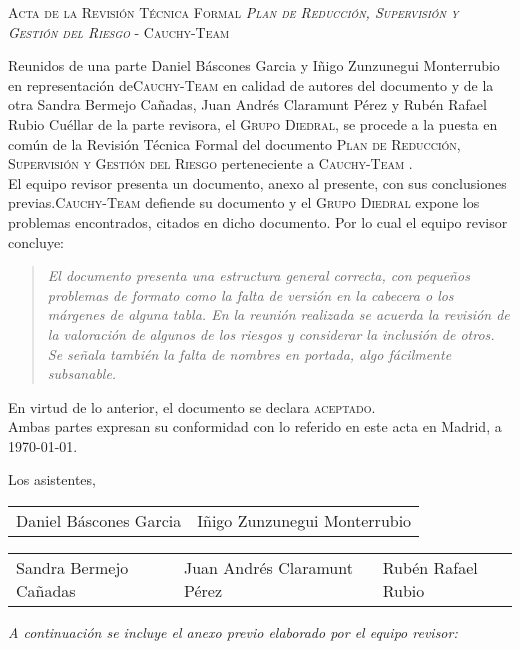 \documentclass[11pt, a4paper, twoside]{article}
\newcommand*{\Cauchy}{\mbox{\textsc{Cauchy-Team}} }
\begin{document}
	\begin{center}
		\scshape \large Acta de la Revisión Técnica Formal \textit{Plan de Reducción, Supervisión y Gestión del Riesgo} - \Cauchy
	\end{center}

	Reunidos de una parte Daniel Báscones Garcia y Iñigo Zunzunegui Monterrubio en representación de\break \Cauchy en calidad de autores del documento y de la otra Sandra Bermejo Cañadas, Juan Andrés Claramunt Pérez y Rubén Rafael Rubio Cuéllar de la parte revisora, el \textsc{Grupo Diedral}, se procede a la puesta en común de la Revisión Técnica Formal del documento \textsc{Plan de Reducción, Supervisión y Gestión del Riesgo} perteneciente a \Cauchy. \\

	El equipo revisor presenta un documento, anexo al presente, con sus conclusiones previas.\break \Cauchy defiende su documento y el \textsc{Grupo Diedral} expone los problemas encontrados, citados en dicho documento. Por lo cual el equipo revisor concluye:

\begin{quotation} \itshape
	El documento presenta una estructura general correcta, con pequeños problemas de formato como la falta de versión en la cabecera o los márgenes de alguna tabla. En la reunión realizada se acuerda la revisión de la valoración de algunos de los riesgos y considerar la inclusión de otros. Se señala también la falta de nombres en portada, algo fácilmente subsanable.
\end{quotation}

\noindent
En virtud de lo anterior, el documento se declara \textsc{aceptado}.\\

	Ambas partes expresan su conformidad con lo referido en este acta en Madrid, a \today.

\begin{flushleft}
	Los asistentes,
\end{flushleft}

\vspace{1cm}

	\begin{tabu} to .9\linewidth {X[1,c] X[1, c]}
		Daniel Báscones Garcia & Iñigo Zunzunegui Monterrubio
	\end{tabu}

	\vfill

	\begin{tabu} to .9\linewidth {X[1,c] X[1, c] X[1, c]}
		Sandra Bermejo Cañadas & Juan Andrés Claramunt Pérez & Rubén Rafael Rubio
	\end{tabu}
	
	\vfill
	{\itshape A continuación se incluye el anexo previo elaborado por el equipo revisor: }

	
\end{document}
